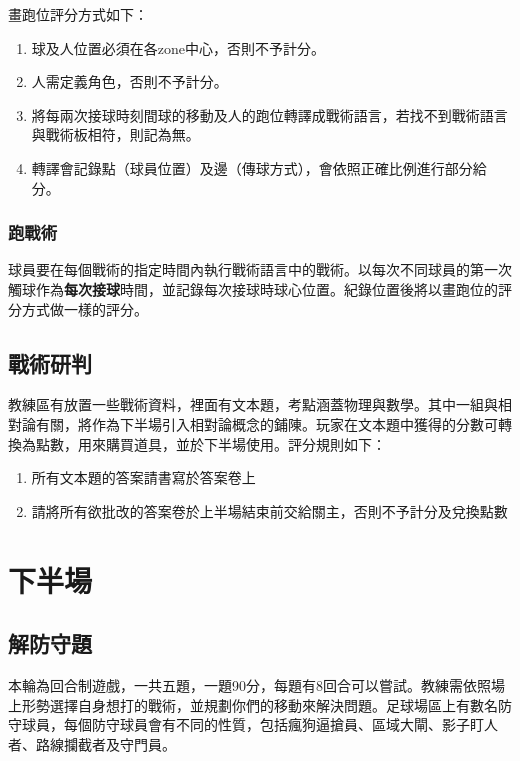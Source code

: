 \documentclass[12pt]{article}
\begin{document}
畫跑位評分方式如下：
\begin{enumerate}
  \item 球及人位置必須在各zone中心，否則不予計分。
  \item 人需定義角色，否則不予計分。
  \item 將每兩次接球時刻間球的移動及人的跑位轉譯成戰術語言，若找不到戰術語言與戰術板相符，則記為無。
  \item 轉譯會記錄點（球員位置）及邊（傳球方式），會依照正確比例進行部分給分。
\end{enumerate}

\subsubsection*{跑戰術}
球員要在每個戰術的指定時間內執行戰術語言中的戰術。以每次不同球員的第一次觸球作為\textbf{每次接球}時間，並記錄每次接球時球心位置。紀錄位置後將以畫跑位的評分方式做一樣的評分。

\subsection*{戰術研判}
教練區有放置一些戰術資料，裡面有文本題，考點涵蓋物理與數學。其中一組與相對論有關，將作為下半場引入相對論概念的鋪陳。玩家在文本題中獲得的分數可轉換為點數，用來購買道具，並於下半場使用。評分規則如下：
\begin{enumerate}
  \item 所有文本題的答案請書寫於答案卷上
  \item 請將所有欲批改的答案卷於上半場結束前交給關主，否則不予計分及兌換點數
\end{enumerate}

\section*{下半場}
\subsection*{解防守題}
本輪為回合制遊戲，一共五題，一題90分，每題有8回合可以嘗試。教練需依照場上形勢選擇自身想打的戰術，並規劃你們的移動來解決問題。足球場區上有數名防守球員，每個防守球員會有不同的性質，包括瘋狗逼搶員、區域大閘、影子盯人者、路線攔截者及守門員。
\end{document}
